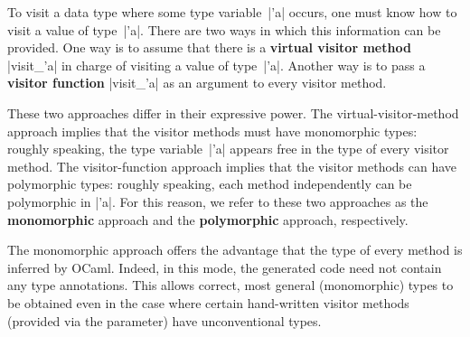 \documentclass[11pt,a4paper,twoside]{article}
\renewcommand{\emph}[1]{\textbf{#1}}
\begin{document}
To visit a data type where some type variable~\oc|'a| occurs, one must know
how to visit a value of type~\oc|'a|.
%
%
There are two ways in which this information can be provided. One way is to
assume that there is a \emph{virtual visitor method} \oc|visit_'a| in charge
of visiting a value of type~\oc|'a|. Another way is to pass a \emph{visitor
  function} \oc|visit_'a| as an argument to every visitor method.


These two approaches differ in their expressive power. The
virtual-visitor-method approach implies that the visitor methods must have
monomorphic types: roughly speaking, the type variable~\oc|'a|
appears free in the type of every visitor method.
The visitor-function approach implies that the visitor methods can have
polymorphic types: roughly speaking, each method independently
can be polymorphic in \oc|'a|.
For this reason, we refer to these two approaches as the \emph{monomorphic}
approach and the \emph{polymorphic} approach, respectively.

The monomorphic approach offers the advantage that the type of every method is
inferred by OCaml. Indeed, in this mode, the generated code need not contain
any type annotations. This allows correct, most general (monomorphic) types to
be obtained even in the case where certain hand-written visitor methods
(provided via the \ancestors parameter) have unconventional types.
%
\end{document}
